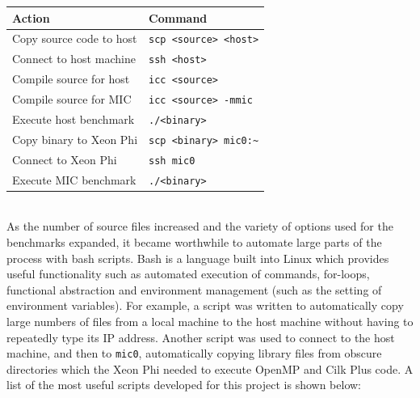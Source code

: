 \documentclass{report}
\begin{document}
\begin{center}
	\begin{tabular}{| l | l | }
	\hline
	{\bf Action} & {\bf Command} \\ \hline
	Copy source code to host & \verb!scp <source> <host>! \\
	Connect to host machine & \verb!ssh <host>! \\
	Compile source for host & \verb!icc <source>! \\
	Compile source for MIC & \verb!icc <source> -mmic! \\
	Execute host benchmark & \verb!./<binary>! \\
	Copy binary to Xeon Phi & \verb!scp <binary> mic0:~! \\
	Connect to Xeon Phi & \verb!ssh mic0! \\
	Execute MIC benchmark & \verb!./<binary>! \\ \hline
	\end{tabular}
\end{center}
\hfill\\
As the number of source files increased and the variety of options used for the benchmarks expanded, it became worthwhile to automate large parts of the process with bash scripts. Bash is a language built into Linux which provides useful functionality such as automated execution of commands, for-loops, functional abstraction and environment management (such as the setting of environment variables). For example, a script was written to automatically copy large numbers of files from a local machine to the host machine without having to repeatedly type its IP address. Another script was used to connect to the host machine, and then to \verb!mic0!, automatically copying library files from obscure directories which the Xeon Phi needed to execute OpenMP and Cilk Plus code. A list of the most useful scripts developed for this project is shown below:
\hfill\\
\end{document}
